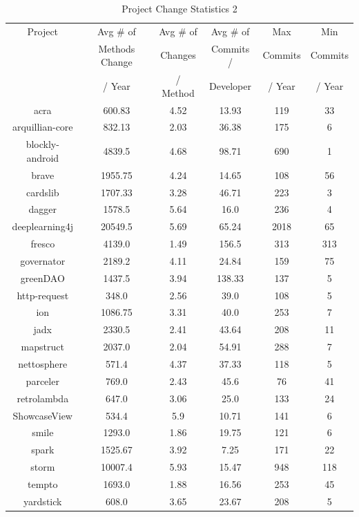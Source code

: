 \begin{table}
\begin{center}
    \begin{tabular}{|c|c|c|c|c|c|}
        \hline
        Project & Avg \# of & Avg \# of & Avg \# of & Max & Min \\
         & Methods Change & Changes & Commits / & Commits & Commits \\
         & / Year & / Method & Developer & / Year & / Year \\
        \hline
        acra & 600.83 & 4.52 & 13.93 & 119 & 33 \\
        arquillian-core & 832.13 & 2.03 & 36.38 & 175 & 6 \\
        blockly-android & 4839.5 & 4.68 & 98.71 & 690 & 1 \\
        brave & 1955.75 & 4.24 & 14.65 & 108 & 56 \\
        cardslib & 1707.33 & 3.28 & 46.71 & 223 & 3 \\
        dagger & 1578.5 & 5.64 & 16.0 & 236 & 4 \\
        deeplearning4j & 20549.5 & 5.69 & 65.24 & 2018 & 65 \\
        fresco & 4139.0 & 1.49 & 156.5 & 313 & 313 \\
        governator & 2189.2 & 4.11 & 24.84 & 159 & 75 \\
        greenDAO & 1437.5 & 3.94 & 138.33 & 137 & 5 \\
        http-request & 348.0 & 2.56 & 39.0 & 108 & 5 \\
        ion & 1086.75 & 3.31 & 40.0 & 253 & 7 \\
        jadx & 2330.5 & 2.41 & 43.64 & 208 & 11 \\
        mapstruct & 2037.0 & 2.04 & 54.91 & 288 & 7 \\
        nettosphere & 571.4 & 4.37 & 37.33 & 118 & 5 \\
        parceler & 769.0 & 2.43 & 45.6 & 76 & 41 \\
        retrolambda & 647.0 & 3.06 & 25.0 & 133 & 24 \\
        ShowcaseView & 534.4 & 5.9 & 10.71 & 141 & 6 \\
        smile & 1293.0 & 1.86 & 19.75 & 121 & 6 \\
        spark & 1525.67 & 3.92 & 7.25 & 171 & 22 \\
        storm & 10007.4 & 5.93 & 15.47 & 948 & 118 \\
        tempto & 1693.0 & 1.88 & 16.56 & 253 & 45 \\
        yardstick & 608.0 & 3.65 & 23.67 & 208 & 5 \\
        \hline
    \end{tabular}
\end{center}
\caption{Project Change Statistics 2}
\label{tab:project_stats_2}
\end{table}

